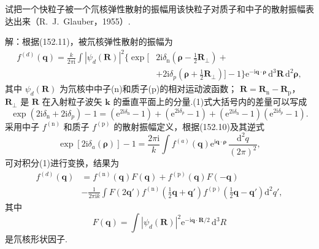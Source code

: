 \begin{xiti}

\quad 试把一个快粒子被一个氘核弹性散射的振幅用该快粒子对质子和中子的散射振幅表达出来（R.~J.~Glauber，1955）.

解：根据(152.11)，被氘核弹性散射的振幅为
\setcounter{equation}{0}\renewcommand{\theequation}{\arabic{equation}}%
\begin{equation}
\begin{aligned}
  f^{(d)}(\boldsymbol{q})=\frac{k}{2\pi\mathrm{i}}\int|\psi_d(\boldsymbol{R})|^2
  \bigg\{\exp\bigg[&2\mathrm{i}\delta_{\mathrm{n}}\left(\boldsymbol{\rho}
  -\frac{1}{2}\boldsymbol{R}_{\perp}\right)+\\
  &+2\mathrm{i}\delta_p\left(\boldsymbol{\rho}
  +\frac{1}{2}\boldsymbol{R}_{\perp}\right)\bigg]-1\bigg\}
  \mathrm{e}^{-\mathrm{i}\boldsymbol{q}\cdot\boldsymbol{\rho}}\,
  \mathrm{d}^3\boldsymbol{R}\,\mathrm{d}^2\boldsymbol{\rho},
\end{aligned}
\end{equation}
其中 $\psi_d(\boldsymbol{R})$ 为氘核中中子(n)和质子(p)的相对运动波函数；
$\boldsymbol{R}=\boldsymbol{R}_{\mathrm{n}}-\boldsymbol{R}_{\mathrm{p}}$，
$\boldsymbol{R}_{\perp}$ 是 $\boldsymbol{R}$ 在入射粒子波矢 $\boldsymbol{k}$ 的垂直平面上的分量.(1)式大括号内的差量可以写成
\begin{equation*}
  \exp(2\mathrm{i}\delta_{\mathrm{n}}+2\mathrm{i}\delta_p)-1
  =\left(\mathrm{e}^{2\mathrm{i}\delta_{\mathrm{n}}}-1\right)
  +\left(\mathrm{e}^{2\mathrm{i}\delta_p}-1\right)
  +\left(\mathrm{e}^{2\mathrm{i}\delta_{\mathrm{n}}}-1\right)
  \left(\mathrm{e}^{2\mathrm{i}\delta_p}-1\right).
\end{equation*}
采用中子 $f^{(\mathrm{n})}$ 和质子 $f^{(\mathrm{p})}$ 的散射振幅定义，根据(152.10)及其逆式
\begin{equation*}
  \exp\left[2\mathrm{i}\delta_a(\boldsymbol{\rho})\right]-1
  =\frac{2\pi\mathrm{i}}{k}\int f^{(a)}(\boldsymbol{q})
  \mathrm{e}^{\mathrm{i}\boldsymbol{q}\cdot\boldsymbol{\rho}}\,
  \frac{\mathrm{d}^2q}{(2\pi)^2},
\end{equation*}
可对积分(1)进行变换，结果为
\begin{equation}
\begin{aligned}
  f^{(d)}(\boldsymbol{q})&=f^{(\mathrm{n})}(\boldsymbol{q})F(\boldsymbol{q})
  +f^{(\mathrm{p})}(\boldsymbol{q})F(-\boldsymbol{q})\\
  &-\frac{1}{2\pi\mathrm{i}k}\int F(2\boldsymbol{q}')
  f^{(\mathrm{n})}\left(\frac{1}{2}\boldsymbol{q}+\boldsymbol{q}'\right)
  f^{(\mathrm{p})}\left(\frac{1}{2}\boldsymbol{q}-\boldsymbol{q}'\right)
  \mathrm{d}^2q',
\end{aligned}
\end{equation}
其中
\begin{equation*}
  F(\boldsymbol{q})=\int|\psi_d(\boldsymbol{R})|^2
  \mathrm{e}^{-\mathrm{i}\boldsymbol{q}\cdot\boldsymbol{R}/2}\,\mathrm{d}^3R
\end{equation*}
是氘核形状因子.


\end{xiti}
